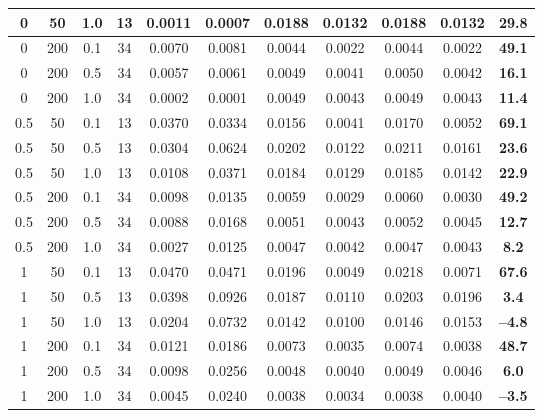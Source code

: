 \begin{table}[ht!]
\begin{tabular}{ccccccccccc}
0 & 50 & 1.0 & 13 & 0.0011 & 0.0007 & 0.0188 & 0.0132 & 0.0188 & 0.0132 & \textbf{29.8} \\
\hline
0 & 200 & 0.1 & 34 & 0.0070 & 0.0081 & 0.0044 & 0.0022 & 0.0044 & 0.0022 & \textbf{49.1} \\
0 & 200 & 0.5 & 34 & 0.0057 & 0.0061 & 0.0049 & 0.0041 & 0.0050 & 0.0042 & \textbf{16.1} \\
0 & 200 & 1.0 & 34 & 0.0002 & 0.0001 & 0.0049 & 0.0043 & 0.0049 & 0.0043 & \textbf{11.4} \\
\hline\hline
0.5 & 50 & 0.1 & 13 & 0.0370 & 0.0334 & 0.0156 & 0.0041 & 0.0170 & 0.0052 & \textbf{69.1} \\
0.5 & 50 & 0.5 & 13 & 0.0304 & 0.0624 & 0.0202 & 0.0122 & 0.0211 & 0.0161 & \textbf{23.6} \\
0.5 & 50 & 1.0 & 13 & 0.0108 & 0.0371 & 0.0184 & 0.0129 & 0.0185 & 0.0142 & \textbf{22.9} \\
\hline
0.5 & 200 & 0.1 & 34 & 0.0098 & 0.0135 & 0.0059 & 0.0029 & 0.0060 & 0.0030 & \textbf{49.2} \\
0.5 & 200 & 0.5 & 34 & 0.0088 & 0.0168 & 0.0051 & 0.0043 & 0.0052 & 0.0045 & \textbf{12.7} \\
0.5 & 200 & 1.0 & 34 & 0.0027 & 0.0125 & 0.0047 & 0.0042 & 0.0047 & 0.0043 & \textbf{8.2} \\
\hline\hline
1 & 50 & 0.1 & 13 & 0.0470 & 0.0471 & 0.0196 & 0.0049 & 0.0218 & 0.0071 & \textbf{67.6} \\
1 & 50 & 0.5 & 13 & 0.0398 & 0.0926 & 0.0187 & 0.0110 & 0.0203 & 0.0196 & \textbf{3.4} \\
1 & 50 & 1.0 & 13 & 0.0204 & 0.0732 & 0.0142 & 0.0100 & 0.0146 & 0.0153 & \textbf{--4.8} \\
\hline
1 & 200 & 0.1 & 34 & 0.0121 & 0.0186 & 0.0073 & 0.0035 & 0.0074 & 0.0038 & \textbf{48.7} \\
1 & 200 & 0.5 & 34 & 0.0098 & 0.0256 & 0.0048 & 0.0040 & 0.0049 & 0.0046 & \textbf{6.0} \\
1 & 200 & 1.0 & 34 & 0.0045 & 0.0240 & 0.0038 & 0.0034 & 0.0038 & 0.0040 & \textbf{--3.5} \\
\hline\hline
\end{tabular}
\end{table}
